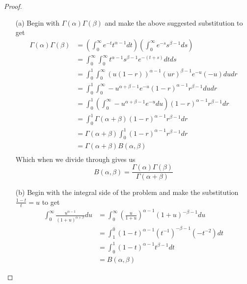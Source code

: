 \documentclass[10pt]{article}
\newcommand{\sk}{\vskip 10mm}
\theoremstyle{plain}
\theoremstyle{remark}
\begin{document}
\begin{proof}
  \begin{enumerate}
  \item[(a)] Begin with $\Gamma(\alpha)\Gamma(\beta)$ and make the above suggested
    substitution to get
    \begin{align*}
      \Gamma(\alpha)\Gamma(\beta) &= (\int_0^\infty e^{-t}t^{\alpha-1}dt)(\int_0^\infty e^{-s}s^{\beta-1}ds)\\
               &=\int_0^\infty\int_0^\infty t^{\alpha-1}s^{\beta-1}e^{-(t+s)}dtds\\
               &=\int_0^1\int_0^\infty(u(1-r))^{\alpha-1}(ur)^{\beta-1}e^{-u}(-u)dudr\\
               &=\int_0^1\int_0^\infty-u^{\alpha+\beta-1}e^{-u}(1-r)^{\alpha-1}r^{\beta-1}dudr\\
               &=\int_0^1(\int_0^\infty-u^{\alpha+\beta-1}e^{-u}du)(1-r)^{\alpha-1}r^{\beta-1}dr\\
               &=\int_0^1\Gamma(\alpha+\beta)(1-r)^{\alpha-1}r^{\beta-1}dr\\
               &=\Gamma(\alpha+\beta)\int_0^1(1-r)^{\alpha-1}r^{\beta-1}dr\\
               &=\Gamma(\alpha+\beta)B(\alpha,\beta)\\
    \end{align*}
    Which when we divide through gives us
    \[
      B(\alpha,\beta)=\frac{\Gamma(\alpha)\Gamma(\beta)}{\Gamma(\alpha+\beta)}
    \]
  \item[(b)] Begin with the integral side of the problem and make the
    substitution $\frac{1-t}{t}=u$ to get
    \begin{align*}
      \int_0^\infty\frac{u^{\alpha-1}}{(1+u)^{\alpha+\beta}}du &= \int_0^\infty (\frac{u}{1+u})^{\alpha-1}(1+u)^{-\beta-1}du\\
                                                  &=\int_1^0 (1-t)^{\alpha-1}(t^{-1})^{-\beta-1}(-t^{-2})dt\\
                                                  &=\int_0^1 (1-t)^{\alpha-1}t^{\beta-1}dt\\
                                                  &=B(\alpha,\beta)
    \end{align*}
  \end{enumerate}
\end{proof}

\sk
\end{document}
